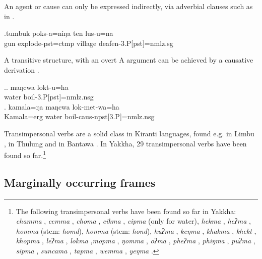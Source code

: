  An agent or cause can only be expressed indirectly, via adverbial clauses such as in \Next.
 
 \exg.tumbuk poks-a=niŋa ten lus-u=na\\
gun explode{\sc [3sg]-pst=ctmp} village  deafen{\sc -3.P[pst]=nmlz.sg}\\

 
 A transitive structure, with an overt A argument can be achieved by a causative derivation \Next. 
 
\ex.\ag. maŋcwa lokt-u=ha\\
water boil{\sc -3.P[pst]=nmlz.nsg}\\
\bg. kamala=ŋa maŋcwa lok-met-wa=ha\\
Kamala{\sc =erg} water boil{\sc -caus-npst[3.P]=nmlz.nsg}\\

Transimpersonal verbs are a solid class in Kiranti languages, found e.g. in Limbu \citep[451]{Driem1987A-grammar}, in Thulung \citep[42]{Allen1975Sketch} and in Bantawa \citep[222]{Doornenbal2009A-grammar}. In Yakkha, 29 transimpersonal verbs have been found so far.\footnote{The following transimpersonal verbs have been found so far in Yakkha: \emph{chamma} , \emph{cemma} , \emph{choma} , \emph{cikma} ,  \emph{cipma}  (only for water),  \emph{hekma} , \emph{heʔma} , \emph{homma} (stem: \emph{homd}), \emph{homma}  (stem: \emph{hond}), \emph{huʔma} , \emph{keŋma} , \emph{khakma} , \emph{khekt} , \emph{khopma} , \emph{leʔma} ,   \emph{lokma} ,\emph{mopma} , \emph{ŋomma} ,   \emph{oʔma} ,  \emph{pheʔma} , \emph{phiŋma} , \emph{puʔma} ,   \emph{sipma} , 
 \emph{suncama} , \emph{tapma} , \emph{wemma} , \emph{yeŋma} .} 



\subsection{Marginally occurring frames}\label{tr-marg}
